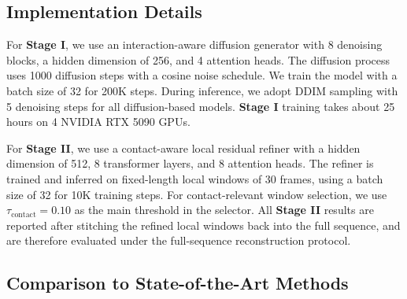 \documentclass{article}
\begin{document}
\subsection{Implementation Details}

For \textbf{Stage I}, we use an interaction-aware diffusion generator with 8 denoising blocks, a hidden dimension of 256, and 4 attention heads. The diffusion process uses 1000 diffusion steps with a cosine noise schedule. We train the model with a batch size of 32 for 200K steps. During inference, we adopt DDIM sampling with 5 denoising steps for all diffusion-based models. \textbf{Stage I} training takes about 25 hours on 4 NVIDIA RTX 5090 GPUs.

For \textbf{Stage II}, we use a contact-aware local residual refiner with a hidden dimension of 512, 8 transformer layers, and 8 attention heads. The refiner is trained and inferred on fixed-length local windows of 30 frames, using a batch size of 32 for 10K training steps. For contact-relevant window selection, we use $\tau_{\text{contact}}=0.10$ as the main threshold in the selector. All \textbf{Stage II} results are reported after stitching the refined local windows back into the full sequence, and are therefore evaluated under the full-sequence reconstruction protocol.





\subsection{Comparison to State-of-the-Art Methods}
\end{document}
